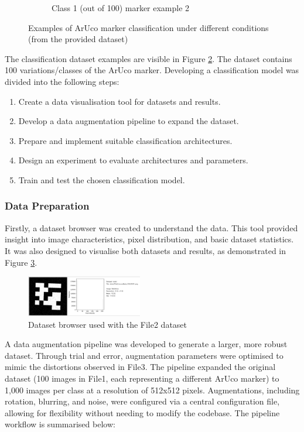 \documentclass[conference]{IEEEtran}
\begin{document}
\begin{figure}[h]
\begin{subfigure}[b]{0.2\textwidth}
      \caption{Class 1 (out of 100) marker example 2}
      \label{fig:class_ex4}
  \end{subfigure}
  \caption{Examples of ArUco marker classification under different conditions (from the provided dataset)}
  \label{fig:classification_examples}
\end{figure}

The classification dataset examples are visible in Figure \ref{fig:classification_examples}. The dataset contains
100 variations/classes of the ArUco marker. Developing a classification model was divided into the following steps:

\begin{enumerate}
  \item Create a data visualisation tool for datasets and results.
  \item Develop a data augmentation pipeline to expand the dataset.
  \item Prepare and implement suitable classification architectures.
  \item Design an experiment to evaluate architectures and parameters.
  \item Train and test the chosen classification model.
\end{enumerate}

\subsubsection{Data Preparation}

Firstly, a dataset browser was created to understand the data. This tool provided insight into image characteristics,
pixel distribution, and basic dataset statistics. It was also designed to visualise both datasets and results, as
demonstrated in Figure \ref{fig:data_browser_1}.

\begin{figure}[h]
  \centering
  \includegraphics[width=0.45\textwidth]{images/aruco-dataset-browser-1.png}
  \caption{Dataset browser used with the File2 dataset}
  \label{fig:data_browser_1}
\end{figure}

A data augmentation pipeline was developed to generate a larger, more robust dataset. Through trial and error, augmentation
parameters were optimised to mimic the distortions observed in File3. The pipeline expanded the original dataset (100 images
in File1, each representing a different ArUco marker) to 1,000 images per class at a resolution of 512x512 pixels. Augmentations, 
including rotation, blurring, and noise, were configured via a central configuration file, allowing for flexibility without 
needing to modify the codebase. The pipeline workflow is summarised below:
\end{document}
